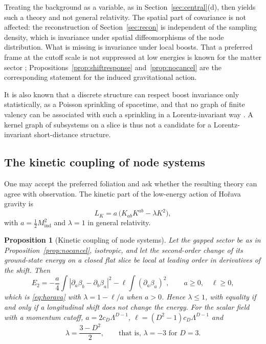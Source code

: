 \documentclass[11pt,a4paper]{article}
\theoremstyle{stmt}
\newtheorem{proposition}[theorem]{Proposition}
\theoremstyle{defn}
\theoremstyle{rmk}
\numberwithin{equation}{section}
\begin{document}
Treating the background as a variable, as in Section~\ref{sec:central}(d), then yields such a theory and not general relativity. The spatial part of covariance is not affected: the reconstruction of Section~\ref{sec:recon} is independent of the sampling density, which is invariance under spatial diffeomorphisms of the node distribution. What is missing is invariance under local boosts. That a preferred frame at the cutoff scale is not suppressed at low energies is known for the matter sector \cite{Collins}; Propositions~\ref{prop:shiftresponse} and~\ref{prop:nocancel} are the corresponding statement for the induced gravitational action.

It is also known that a discrete structure can respect boost invariance only statistically, as a Poisson sprinkling of spacetime, and that no graph of finite valency can be associated with such a sprinkling in a Lorentz-invariant way \cite{BHS}. A kernel graph of subsystems on a slice is thus not a candidate for a Lorentz-invariant short-distance structure.

\subsection{The kinetic coupling of node systems}\label{sec:kinetic}

One may accept the preferred foliation and ask whether the resulting theory can agree with observation. The kinetic part of the low-energy action of Ho\v{r}ava gravity is
\begin{equation}\label{eq:horava}
L_K=a\,\big(K_{ab}K^{ab}-\lambda K^2\big),
\end{equation}
with $a=\tfrac12M_{\mathrm{ind}}^2$ and $\lambda=1$ in general relativity.

\begin{proposition}[Kinetic coupling of node systems]\label{prop:lambda}
Let the gapped sector be as in Proposition~\ref{prop:nocancel}, isotropic, and let the second-order change of its ground-state energy on a closed flat slice be local at leading order in derivatives of the shift. Then
\begin{equation}\label{eq:al}
E_2=-\frac a4\int|\partial_a\beta_b-\partial_b\beta_a|^2-\ell\int(\partial_a\beta_a)^2,\qquad a\ge0,\quad\ell\ge0,
\end{equation}
which is \eqref{eq:horava} with $\lambda=1-\ell/a$ when $a>0$. Hence $\lambda\le1$, with equality if and only if a longitudinal shift does not change the energy. For the scalar field with a momentum cutoff, $a=2c_D\Lambda^{D-1}$, $\ell=(D^2-1)c_D\Lambda^{D-1}$ and
\begin{equation}\label{eq:lambdaval}
\lambda=\frac{3-D^2}{2},\qquad\text{that is, }\lambda=-3\text{ for }D=3 .
\end{equation}
\end{proposition}
\end{document}
